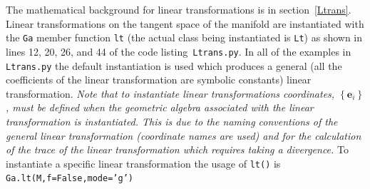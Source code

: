 \documentclass[12pt]{report}
\newcommand{\bm}[1]{\boldsymbol{#1}}
\newcommand{\lbrc}{\left \{}
\newcommand{\rbrc}{\right \}}
\newcommand{\set}[1]{\lbrc {#1} \rbrc}
\newcommand{\T}[1]{\texttt{#1}}
\begin{document}
The mathematical background for linear transformations is in section~\ref{Ltrans}.  Linear transformations on the tangent space of
the manifold are instantiated with the \T{Ga} member function \T{lt} (the actual class being instantiated is \T{Lt}) as shown in
 lines 12, 20, 26, and 44 of the
code listing~\T{Ltrans.py}. In all of the examples in \T{Ltrans.py} the default instantiation is used which produces a general (all the
coefficients of the linear transformation are symbolic constants) linear transformation. \emph{Note that to instantiate linear transformations
coordinates, $\set{\bm{e}_{i}}$, must be defined when the geometric algebra associated with the linear transformation is instantiated.
This is due to the naming conventions of the general linear transformation (coordinate names are used) and for the calculation
of the trace of the linear transformation which requires taking a divergence.} To instantiate a specific linear transformation
the usage of \T{lt()} is
\T{Ga.lt(M,f=False,mode='g')}
\newpage
\end{document}
